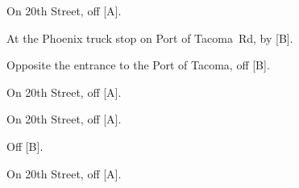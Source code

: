 
\begin{LocationList}

On 20th Street, off  [A].

At the Phoenix truck stop on Port of Tacoma~Rd, by  [B].

Opposite the entrance to the Port of Tacoma, off  [B].

On 20th Street, off  [A].

On 20th Street, off  [A].

Off  [B].

On 20th Street, off  [A].

\end{LocationList}
